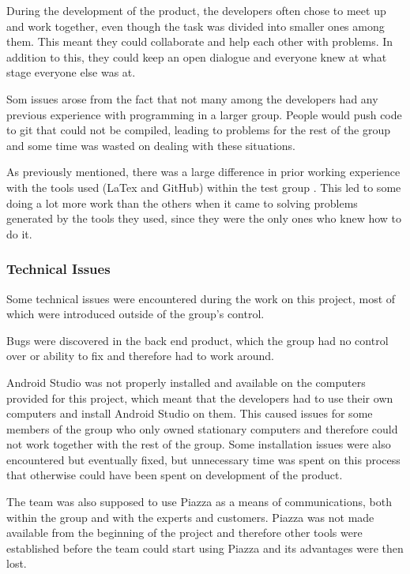\documentclass[a4paper]{article}
\begin{document}
During the development of the product, the developers often chose to meet up and work together, even though the task was divided into smaller ones among them. This meant they could collaborate and help each other with problems. In addition to this, they could keep an open dialogue and everyone knew at what stage everyone else was at.

Som issues arose from the fact that not many among the developers had any previous experience with programming in a larger group. People would push code to git that could not be compiled, leading to problems for the rest of the group and some time was wasted on dealing with these situations.

As previously mentioned, there was a large difference in prior working experience with the tools used (LaTex and GitHub) within the test group . This led to some doing a lot more work than the others when it came to solving problems generated by the tools they used, since they were the only ones who knew how to do it.



\subsubsection{Technical Issues}

Some technical issues were encountered during the work on this project, most of which were introduced outside of the group's control.

Bugs were discovered in the back end product, which the group had no control over or ability to fix and therefore had to work around.

Android Studio was not properly installed and available on the computers provided for this project, which meant that the developers had to use their own computers and install Android Studio on them. This caused issues for some members of the group who only owned stationary computers and therefore could not work together with the rest of the group. Some installation issues were also encountered but eventually fixed, but unnecessary time was spent on this process that otherwise could have been spent on development of the product.

The team was also supposed to use Piazza as a means of communications, both within the group and with the experts and customers. Piazza was not made available from the beginning of the project and therefore other tools were established before the team could start using Piazza and its advantages were then lost.
\end{document}
